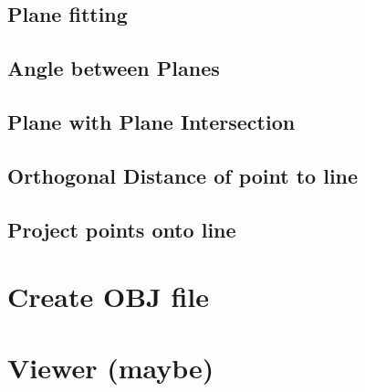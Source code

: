		\subsection{Plane fitting}
		
		\subsection{Angle between Planes}
		
		\subsection{Plane with Plane Intersection}
		
		\subsection{Orthogonal Distance of point to line}
		
		\subsection{Project points onto line}
		
	\section{Create OBJ file}
	
	\section{Viewer (maybe)}
